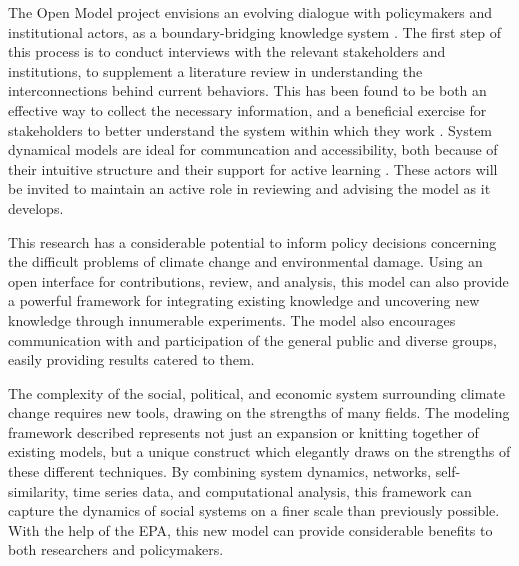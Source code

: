 \documentclass[12pt, oneside]{amsart}
\begin{document}
The Open Model project envisions an evolving dialogue with policymakers and institutional actors, as a boundary-bridging knowledge system \citep{cash2003knowledge}.  The first step of this process is to conduct interviews with the relevant stakeholders and institutions, to supplement a literature review in understanding the interconnections behind current behaviors.  This has been found to be both an effective way to collect the necessary information, and a beneficial exercise for stakeholders to better understand the system within which they work \citep{rouwette2002group}.  System dynamical models are ideal for communcation and accessibility, both because of their intuitive structure and their support for active learning \citep{senge2006fifth}.  These actors will be invited to maintain an active role in reviewing and advising the model as it develops.

This research has a considerable potential to inform policy decisions concerning the difficult problems of climate change and environmental damage.  Using an open interface for contributions, review, and analysis, this model can also provide a powerful framework for integrating existing knowledge and uncovering new knowledge through innumerable experiments.  The model also encourages communication with and participation of the general public and diverse groups, easily providing results catered to them.

The complexity of the social, political, and economic system surrounding climate change requires new tools, drawing on the strengths of many fields.  The modeling framework described represents not just an expansion or knitting together of existing models, but a unique construct which elegantly draws on the strengths of these different techniques.  By combining system dynamics, networks, self-similarity, time series data, and computational analysis, this framework can capture the dynamics of social systems on a finer scale than previously possible.  With the help of the EPA, this new model can provide considerable benefits to both researchers and policymakers.

\newpage
{}

\end{document}
